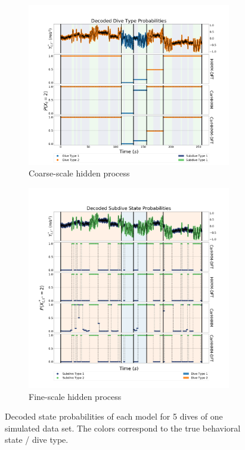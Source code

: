 \begin{figure}[ht]
    \centering
    \begin{subfigure}[t]{1.0\textwidth}
        \centering
        \includegraphics[width=3.5in]{../Plots/Posterior_Coarse_States.png}
        \caption{Coarse-scale hidden process}
    \end{subfigure}
    \begin{subfigure}[t]{1.0\textwidth}
        \centering
        \includegraphics[width=3.5in]{../Plots/Posterior_Fine_States.png}
        \caption{Fine-scale hidden process}
    \end{subfigure}
	\caption{Decoded state probabilities of each model for 5 dives of one simulated data set. The colors correspond to the true behavioral state / dive type.}
	\label{fig:acc}
\end{figure}


